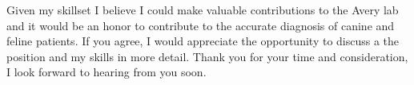 \documentclass[11pt,a4paper,sans]{moderncv}
\begin{document}
\begin{spacing}{1.2}
Given my skillset I believe I could make valuable contributions to the Avery lab and it would be an honor to contribute to the accurate diagnosis of canine and feline patients. If you agree, I would appreciate the opportunity to discuss a the position and my skills in more detail. Thank you for your time and consideration, I look forward to hearing from you soon.


 

\end{spacing}
\makeletterclosing
\end{document}
